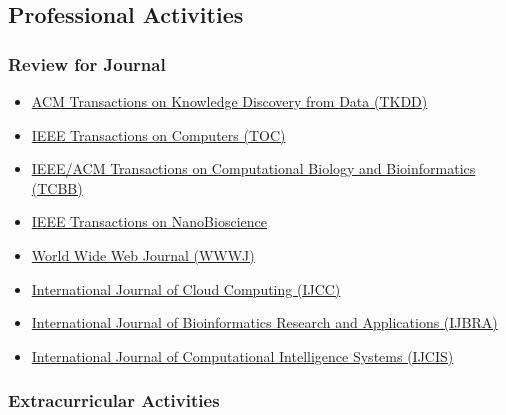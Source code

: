 \documentclass[10pt,a4paper]{article}
\begin{document}
\subsection{Professional Activities}\label{professional-activities}

\subsubsection{Review for Journal}\label{review-for-journal}

\begin{itemize}
\itemsep1pt\parskip0pt
\item
  \href{http://tkdd.acm.org/}{ACM Transactions on Knowledge Discovery
  from Data (TKDD)}
\item
  \href{http://www.computer.org/portal/web/tc}{IEEE Transactions on
  Computers (TOC)}
\item
  \href{http://www.computer.org/portal/web/tcbb}{IEEE/ACM Transactions
  on Computational Biology and Bioinformatics (TCBB)}
\item
  \href{http://ieeexplore.ieee.org/xpl/RecentIssue.jsp?punumber=7728}{IEEE
  Transactions on NanoBioscience}
\item
  \href{http://www.editorialmanager.com/wwwj/}{World Wide Web Journal
  (WWWJ)}
\item
  \href{http://www.inderscience.com/jhome.php?jcode=ijcc}{International
  Journal of Cloud Computing (IJCC)}
\item
  \href{http://www.inderscience.com/jhome.php?jcode=ijbra}{International
  Journal of Bioinformatics Research and Applications (IJBRA)}
\item
  \href{http://www.atlantis-press.com/publications/ijcis/}{International
  Journal of Computational Intelligence Systems (IJCIS)}
\end{itemize}

\subsubsection{Extracurricular
Activities}\label{extracurricular-activities}

\renewenvironment{description}{
  \begin{basedescript}{\desclabelstyle{\pushlabel}\desclabelwidth{4em}}
}{
  \end{basedescript}
}
\end{document}
